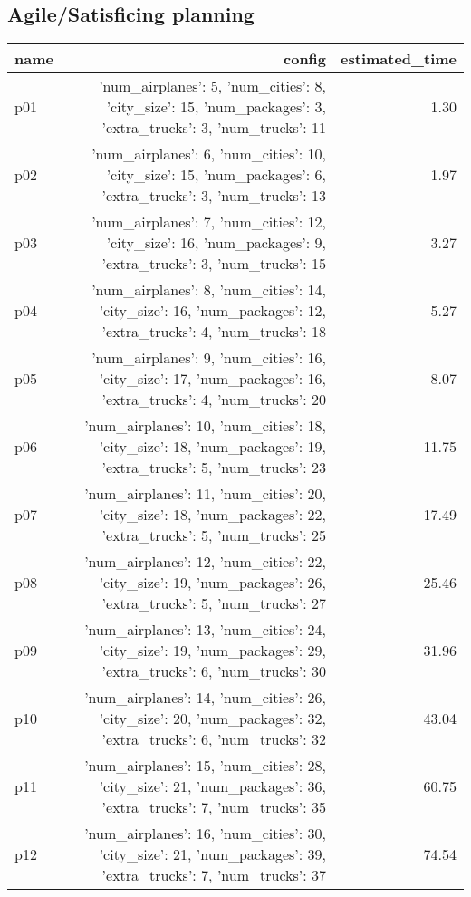 \documentclass{article}
\begin{document}
                                \subsection*{Agile/Satisficing planning}
                                
                            \begin{center}
                            \scriptsize
                            \begin{tabular}{@{}l|r|r@{}}
                            name & config & estimated\_time\\\midrule
                              p01&{'num\_airplanes': 5, 'num\_cities': 8, 'city\_size': 15, 'num\_packages': 3, 'extra\_trucks': 3, 'num\_trucks': 11}&1.30\\
  p02&{'num\_airplanes': 6, 'num\_cities': 10, 'city\_size': 15, 'num\_packages': 6, 'extra\_trucks': 3, 'num\_trucks': 13}&1.97\\
  p03&{'num\_airplanes': 7, 'num\_cities': 12, 'city\_size': 16, 'num\_packages': 9, 'extra\_trucks': 3, 'num\_trucks': 15}&3.27\\
  p04&{'num\_airplanes': 8, 'num\_cities': 14, 'city\_size': 16, 'num\_packages': 12, 'extra\_trucks': 4, 'num\_trucks': 18}&5.27\\
  p05&{'num\_airplanes': 9, 'num\_cities': 16, 'city\_size': 17, 'num\_packages': 16, 'extra\_trucks': 4, 'num\_trucks': 20}&8.07\\
  p06&{'num\_airplanes': 10, 'num\_cities': 18, 'city\_size': 18, 'num\_packages': 19, 'extra\_trucks': 5, 'num\_trucks': 23}&11.75\\
  p07&{'num\_airplanes': 11, 'num\_cities': 20, 'city\_size': 18, 'num\_packages': 22, 'extra\_trucks': 5, 'num\_trucks': 25}&17.49\\
  p08&{'num\_airplanes': 12, 'num\_cities': 22, 'city\_size': 19, 'num\_packages': 26, 'extra\_trucks': 5, 'num\_trucks': 27}&25.46\\
  p09&{'num\_airplanes': 13, 'num\_cities': 24, 'city\_size': 19, 'num\_packages': 29, 'extra\_trucks': 6, 'num\_trucks': 30}&31.96\\
  p10&{'num\_airplanes': 14, 'num\_cities': 26, 'city\_size': 20, 'num\_packages': 32, 'extra\_trucks': 6, 'num\_trucks': 32}&43.04\\
  p11&{'num\_airplanes': 15, 'num\_cities': 28, 'city\_size': 21, 'num\_packages': 36, 'extra\_trucks': 7, 'num\_trucks': 35}&60.75\\
  p12&{'num\_airplanes': 16, 'num\_cities': 30, 'city\_size': 21, 'num\_packages': 39, 'extra\_trucks': 7, 'num\_trucks': 37}&74.54\\

\end{tabular}
\end{center}
\end{document}
